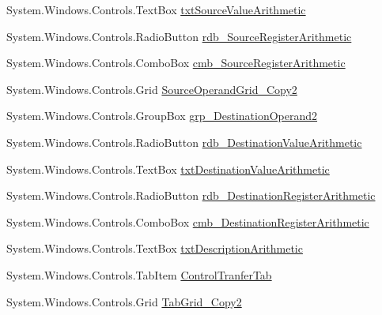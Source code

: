 \begin{DoxyCompactItemize}
System.\+Windows.\+Controls.\+Text\+Box \hyperlink{class_c_p_u___o_s___simulator_1_1_instructions_window_afc01788dc74f761b6cce800975394d2e}{txt\+Source\+Value\+Arithmetic}
\item 
System.\+Windows.\+Controls.\+Radio\+Button \hyperlink{class_c_p_u___o_s___simulator_1_1_instructions_window_ad571b65d5fe87bdb079c807dcac0680f}{rdb\+\_\+\+Source\+Register\+Arithmetic}
\item 
System.\+Windows.\+Controls.\+Combo\+Box \hyperlink{class_c_p_u___o_s___simulator_1_1_instructions_window_aad493dd174601ec265d5ad261f33d525}{cmb\+\_\+\+Source\+Register\+Arithmetic}
\item 
System.\+Windows.\+Controls.\+Grid \hyperlink{class_c_p_u___o_s___simulator_1_1_instructions_window_a6a57e0ae92b85cd619ef3d879ef0c628}{Source\+Operand\+Grid\+\_\+\+Copy2}
\item 
System.\+Windows.\+Controls.\+Group\+Box \hyperlink{class_c_p_u___o_s___simulator_1_1_instructions_window_adc32bbf0f47985507d606abb4862072f}{grp\+\_\+\+Destination\+Operand2}
\item 
System.\+Windows.\+Controls.\+Radio\+Button \hyperlink{class_c_p_u___o_s___simulator_1_1_instructions_window_a2e87a90d55ec015190b55bd06c273efc}{rdb\+\_\+\+Destination\+Value\+Arithmetic}
\item 
System.\+Windows.\+Controls.\+Text\+Box \hyperlink{class_c_p_u___o_s___simulator_1_1_instructions_window_adac073cb591b15be22d041695ff498e4}{txt\+Destination\+Value\+Arithmetic}
\item 
System.\+Windows.\+Controls.\+Radio\+Button \hyperlink{class_c_p_u___o_s___simulator_1_1_instructions_window_a40ebdc8941fbd7ae75ca6d14d1153569}{rdb\+\_\+\+Destination\+Register\+Arithmetic}
\item 
System.\+Windows.\+Controls.\+Combo\+Box \hyperlink{class_c_p_u___o_s___simulator_1_1_instructions_window_ad1fafd2bef9ad3f94fab585ea58fc38c}{cmb\+\_\+\+Destination\+Register\+Arithmetic}
\item 
System.\+Windows.\+Controls.\+Text\+Box \hyperlink{class_c_p_u___o_s___simulator_1_1_instructions_window_a31ef64d4c64f9791d6b4aad95cd4d95f}{txt\+Description\+Arithmetic}
\item 
System.\+Windows.\+Controls.\+Tab\+Item \hyperlink{class_c_p_u___o_s___simulator_1_1_instructions_window_a52cb165b57f01928c088b3052de70b5b}{Control\+Tranfer\+Tab}
\item 
System.\+Windows.\+Controls.\+Grid \hyperlink{class_c_p_u___o_s___simulator_1_1_instructions_window_ac4b83982bf62dc5c0484ac2729167ba4}{Tab\+Grid\+\_\+\+Copy2}

\end{DoxyCompactItemize}
